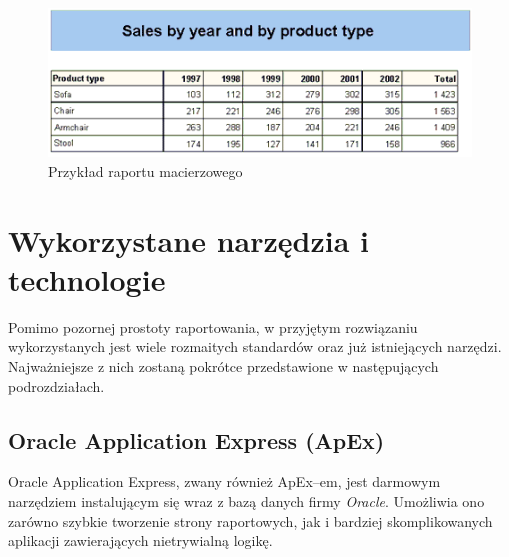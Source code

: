 \documentclass[11pt,a4paper]{article}
\begin{document}
\begin{figure}[h]
\centering
\includegraphics[scale=1]{crosstab_report}
\caption{Przykład raportu macierzowego}
\label{img:ct}
\end{figure}

\newpage

\section{Wykorzystane narzędzia i technologie} \label{sec:tools}
Pomimo pozornej prostoty raportowania, w przyjętym rozwiązaniu wykorzystanych jest wiele rozmaitych standardów oraz już istniejących narzędzi. Najważniejsze z nich zostaną pokrótce przedstawione w następujących podrozdziałach.

\subsection{Oracle Application Express (ApEx)} \label{tools:apex}
Oracle Application Express, zwany również ApEx--em, jest darmowym narzędziem instalującym się wraz z bazą danych firmy \emph{Oracle}. Umożliwia ono zarówno szybkie tworzenie strony raportowych, jak i bardziej skomplikowanych aplikacji zawierających nietrywialną logikę.
\end{document}
